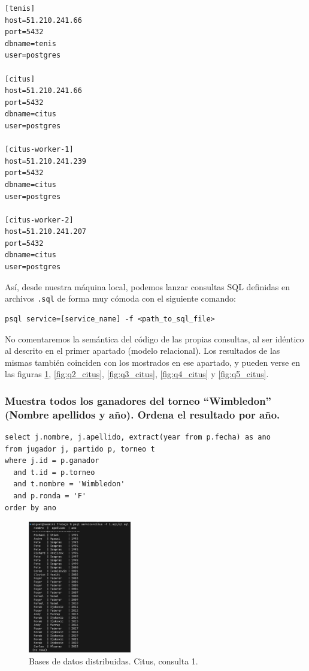 \begin{verbatim}
[tenis]
host=51.210.241.66
port=5432
dbname=tenis
user=postgres

[citus]
host=51.210.241.66
port=5432
dbname=citus
user=postgres

[citus-worker-1]
host=51.210.241.239
port=5432
dbname=citus
user=postgres

[citus-worker-2]
host=51.210.241.207
port=5432
dbname=citus
user=postgres
\end{verbatim}

Así, desde nuestra máquina local, podemos lanzar consultas SQL definidas en archivos \texttt{.sql} de forma muy cómoda con el siguiente comando:

\begin{verbatim}
psql service=[service_name] -f <path_to_sql_file>
\end{verbatim}

No comentaremos la semántica del código de las propias consultas, al ser idéntico al descrito en el primer apartado (modelo relacional). Los resultados de las mismas también coinciden con los mostrados en ese apartado, y pueden verse en las figuras \ref{fig:q1_citus}, \ref{fig:q2_citus}, \ref{fig:q3_citus}, \ref{fig:q4_citus} y \ref{fig:q5_citus}.

\subsubsection{Muestra todos los ganadores del torneo ``Wimbledon'' (Nombre apellidos y año). Ordena el resultado por año.}

\begin{verbatim}
select j.nombre, j.apellido, extract(year from p.fecha) as ano
from jugador j, partido p, torneo t
where j.id = p.ganador 
  and t.id = p.torneo 
  and t.nombre = 'Wimbledon' 
  and p.ronda = 'F'
order by ano
\end{verbatim}
\begin{figure}[H]
\centering
\includegraphics[width=0.4\textwidth]{fotos/citus/q1.png}
\caption{Bases de datos distribuidas. Citus, consulta 1.}
\label{fig:q1_citus}
\end{figure}


